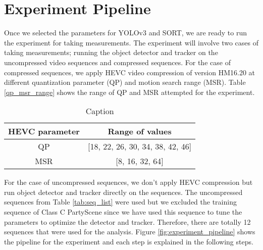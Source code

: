 \section{Experiment Pipeline}
\label{sec:methods/section_c}

Once we selected the parameters for YOLOv3 and SORT, we are ready to run the experiment for taking measurements. The experiment will involve two cases of taking measurements; running the object detector and tracker on the uncompressed video sequences and compressed sequences. For the case of compressed sequences, we apply HEVC video compression of version HM16.20 at different quantization parameter (QP) and motion search range (MSR). Table \ref{qp_msr_range} shows the range of QP and MSR attempted for the experiment.
\begin{table}[]
    \centering
    \begin{tabular}{|c|c|}
        \hline
        HEVC parameter & Range of values \\
        \hline
        \hline
        QP & [18, 22, 26, 30, 34, 38, 42, 46] \\
        \hline
        MSR & [8, 16, 32, 64] \\
        \hline
    \end{tabular}
    \caption{Caption}
    \label{tab:qp_msr_range}
\end{table}
For the case of uncompressed sequences, we don't apply HEVC compression but run object detector and tracker directly on the sequences. The uncompressed sequences from Table \ref{tab:seq_list} were used but we excluded the training sequence of Class C PartyScene since we have used this sequence to tune the parameters to optimize the detector and tracker. Therefore, there are totally 12 sequences that were used for the analysis. Figure \ref{fig:experiment_pipeline} shows the pipeline for the experiment and each step is explained in the following steps.



